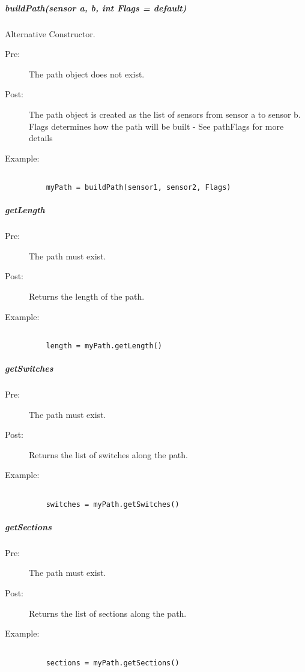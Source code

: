 \documentclass[a4paper,11pt,notitlepage]{article}
\begin{document}
\subparagraph{buildPath(sensor a, b, int Flags = default)} Alternative Constructor.
\begin{description}
\item[\hspace{1cm}Pre:] The path object does not exist.
\item[\hspace{1cm}Post:] The path object is created as the list of sensors from sensor a to sensor b. Flags determines how the path will be built - See pathFlags for more details
\item[\hspace{1cm}Example:]
\begin{verbatim}

    myPath = buildPath(sensor1, sensor2, Flags)
\end{verbatim}
\end{description}

\subparagraph{getLength}
\begin{description}
\item[\hspace{1cm}Pre:] The path must exist.
\item[\hspace{1cm}Post:] Returns the length of the path.
\item[\hspace{1cm}Example:]
\begin{verbatim}

    length = myPath.getLength()
\end{verbatim}
\end{description}

\subparagraph{getSwitches}
\begin{description}
\item[\hspace{1cm}Pre:] The path must exist.
\item[\hspace{1cm}Post:] Returns the list of switches along the path.
\item[\hspace{1cm}Example:]
\begin{verbatim}

    switches = myPath.getSwitches()
\end{verbatim}
\end{description}

\subparagraph{getSections}
\begin{description}
\item[\hspace{1cm}Pre:] The path must exist.
\item[\hspace{1cm}Post:] Returns the list of sections along the path.
\item[\hspace{1cm}Example:]
\begin{verbatim}

    sections = myPath.getSections()
\end{verbatim}
\end{description}
\end{document}
